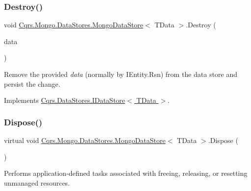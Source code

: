 \subsubsection{\texorpdfstring{Destroy()}{Destroy()}}
{\footnotesize\ttfamily void \hyperlink{classCqrs_1_1Mongo_1_1DataStores_1_1MongoDataStore}{Cqrs.\+Mongo.\+Data\+Stores.\+Mongo\+Data\+Store}$<$ T\+Data $>$.Destroy (\begin{DoxyParamCaption}\item[{T\+Data}]{data }\end{DoxyParamCaption})}



Remove the provided {\itshape data}  (normally by I\+Entity.\+Rsn) from the data store and persist the change. 



Implements \hyperlink{interfaceCqrs_1_1DataStores_1_1IDataStore_aa7ade96f2f3151d5353cf7bdbb2baec5_aa7ade96f2f3151d5353cf7bdbb2baec5}{Cqrs.\+Data\+Stores.\+I\+Data\+Store$<$ T\+Data $>$}.

\mbox{\label{classCqrs_1_1Mongo_1_1DataStores_1_1MongoDataStore_a4af729196a5fa4962961c9ce38b74891_a4af729196a5fa4962961c9ce38b74891}} 
\subsubsection{\texorpdfstring{Dispose()}{Dispose()}}
{\footnotesize\ttfamily virtual void \hyperlink{classCqrs_1_1Mongo_1_1DataStores_1_1MongoDataStore}{Cqrs.\+Mongo.\+Data\+Stores.\+Mongo\+Data\+Store}$<$ T\+Data $>$.Dispose (\begin{DoxyParamCaption}{ }\end{DoxyParamCaption})\hspace{0.3cm}{\ttfamily [virtual]}}



Performs application-\/defined tasks associated with freeing, releasing, or resetting unmanaged resources. 

\mbox{\label{classCqrs_1_1Mongo_1_1DataStores_1_1MongoDataStore_a3eeaf3e59a540025ff2aa0f62b5dd465_a3eeaf3e59a540025ff2aa0f62b5dd465}} 
